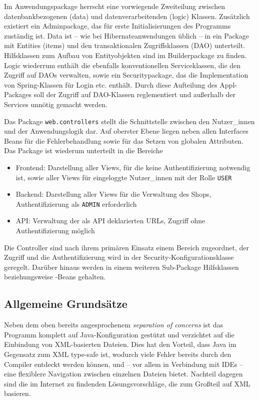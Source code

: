 Im Anwendungspackage herrscht eine vorwiegende Zweiteilung zwischen datenbankbezogenen (data) und datenverarbeitenden (logic) Klassen. Zusätzlich existiert ein Adminpackage, das für erste Initialisierungen des Programms zuständig ist. Data ist -- wie bei Hibernateanwendungen üblich -- in ein Package mit Entities (items) und den transaktionalen Zugriffsklassen (DAO) unterteilt. Hilfsklassen zum Aufbau von Entityobjekten sind im Builderpackage zu finden. Logic wiederrum enthält die ebenfalls konventionellen Serviceklassen, die den Zugriff auf DAOs verwalten, sowie ein Securitypackage, das die Implementation von Spring-Klassen für Login etc. enthält. Durch diese Aufteilung des Appl-Packages soll der Zugriff auf DAO-Klassen reglementiert und außerhalb der Services unnötig gemacht werden.

Das Package \lstinline|web.controllers| stellt die Schnittstelle zwischen den Nutzer\_innen und der Anwendungslogik dar. Auf oberster Ebene liegen neben allen Interfaces Beans für die Fehlerbehandlung sowie für das Setzen von globalen Attributen. Das Package ist wiede\-rum unterteilt in die Bereiche
\begin{itemize}
	\item Frontend: Darstellung aller Views, für die keine Authentifizierung notwendig ist, sowie aller Views für eingeloggte Nutzer\_innen mit der Rolle \lstinline|USER|
	\item Backend: Darstellung aller Views für die Verwaltung des Shops, Authentifizierung als \lstinline|ADMIN| erforderlich
	\item API: Verwaltung der als API deklarierten URLs, Zugriff ohne Authentifizierung möglich
\end{itemize}
Die Controller sind nach ihrem primären Einsatz einem Bereich zugeordnet, der Zugriff und die Authentifizierung wird in der Security-Konfigurationsklasse geregelt. Darüber hi\-naus werden in einem weiteren Sub-Package Hilfsklassen beziehungsweise -Beans gehalten.

\subsection{Allgemeine Grundsätze}

Neben dem oben bereits angesprochenem \textit{separation of concerns} ist das Programm komplett auf Java-Konfiguration gestützt und verzichtet auf die Einbindung von XML-basierten Dateien. Dies hat den Vorteil, dass Java im Gegensatz zum XML type-safe ist, wodurch viele Fehler bereits durch den Compiler entdeckt werden können, und -- vor allem in Verbindung mit IDEs -- eine flexiblere Navigation zwischen einzelnen Dateien bietet. Nachteil dagegen sind die im Internet zu findenden Lösungsvorschläge, die zum Großteil auf XML basieren.

